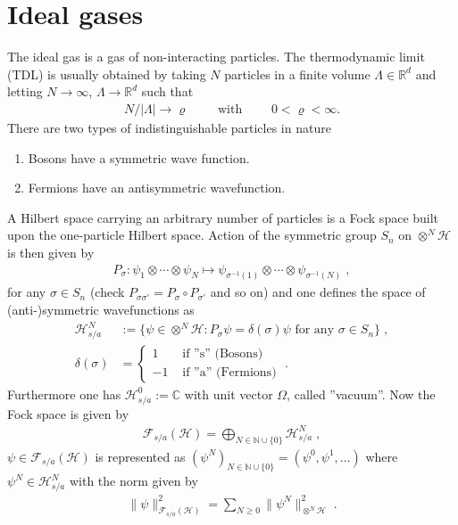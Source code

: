 \documentclass[
a4paper, %
11pt, %
onecolumn, %
openany, %
]{memoir}
\theoremstyle{definition}
\theoremstyle{remark}
\theoremstyle{plain}
\begin{document}
\chapter{Ideal gases}
The ideal gas is a gas of non-interacting particles. The thermodynamic limit (TDL) is usually obtained by taking $N$ particles in a  finite volume $\Lambda\in \mathbb{R}^d$ and letting $N\rightarrow\infty$, $\Lambda\rightarrow\mathbb{R}^d$ such that \begin{align}
N/|\Lambda|\rightarrow \varrho \qquad \text{ with } \qquad 0<\varrho < \infty.
\end{align}
There are two types of indistinguishable particles in nature \begin{enumerate}
	\item Bosons have a symmetric wave function.
	\item Fermions have an antisymmetric wavefunction.
\end{enumerate}
A Hilbert space carrying an arbitrary number of particles is a Fock space built upon the one-particle Hilbert space. Action of the symmetric group $S_n$ on $\otimes^N\mathcal{H}$ is then given by \begin{align}
P_{\sigma}:\psi_1\otimes \cdots \otimes \psi_N \longmapsto {\psi}_{\sigma^{-1}(1)}\otimes \cdots \otimes \psi_{\sigma^{-1}(N)}\; ,
\end{align}
for any $\sigma\in S_n$ (check $P_{\sigma\sigma'}=P_{\sigma}\circ P_{\sigma'}$ and so on) and one defines the space of (anti-)symmetric wavefunctions as \begin{align}
\mathcal{H}_{s/a}^{N}&:=\{\psi\in\otimes^N\mathcal{H}:P_{\sigma}\psi=\delta(\sigma)\psi \text{ for any } \sigma\in S_n\}\; ,\\\delta(\sigma)&=\begin{cases}
1 &\text{ if ''s'' (Bosons)}\\
-1 &\text{ if ''a'' (Fermions)}
\end{cases}\; .
\end{align}
Furthermore one has $\mathcal{H}_{s/a}^0:=\mathbb{C}$ with unit vector $\Omega$, called ''vacuum''. Now the Fock space is given by \begin{align}
\mathcal{F}_{s/a}(\mathcal{H})=\bigoplus_{N\in\mathbb{N}\cup\{0\}}\mathcal{H}_{s/a}^N\; ,
\end{align}
$\psi\in\mathcal{F}_{s/a}(\mathcal{H})$ is represented as $(\psi^N)_{N\in\mathbb{N}\cup\{0\}}=(\psi^0,\psi^1,\ldots)$ where $\psi^N\in\mathcal{H}^N_{s/a}$ with the norm given by \begin{align}
\|\psi\|^2_{\mathcal{F}_{s/a}(\mathcal{H})}=\sum_{N\geq 0}\|\psi^N\|^2_{\otimes^N\mathcal{H}}\; .
\end{align}
\end{document}
